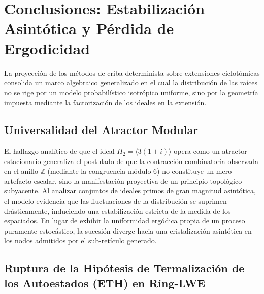 \documentclass{article}
\numberwithin{equation}{section}
\theoremstyle{plain}
\theoremstyle{definition}
\begin{document}
\section{Conclusiones: Estabilización Asintótica y Pérdida de Ergodicidad}
\label{sec:discusion_conclusiones}

La proyección de los métodos de criba determinista sobre extensiones ciclotómicas consolida un marco algebraico generalizado en el cual la distribución de las raíces no se rige por un modelo probabilístico isotrópico uniforme, sino por la geometría impuesta mediante la factorización de los ideales en la extensión.

\subsection{Universalidad del Atractor Modular}

El hallazgo analítico de que el ideal $\Pi_2 = \langle 3(1+i) \rangle$ opera como un atractor estacionario generaliza el postulado de que la contracción combinatoria observada en el anillo $\mathbb{Z}$ (mediante la congruencia módulo $6$) no constituye un mero artefacto escalar, sino la manifestación proyectiva de un principio topológico subyacente. Al analizar conjuntos de ideales primos de gran magnitud asintótica, el modelo evidencia que las fluctuaciones de la distribución se suprimen drásticamente, induciendo una estabilización estricta de la medida de los espaciados. En lugar de exhibir la uniformidad ergódica propia de un proceso puramente estocástico, la sucesión diverge hacia una cristalización asintótica en los nodos admitidos por el sub-retículo generado.

\subsection{Ruptura de la Hipótesis de Termalización de los Autoestados (ETH) en Ring-LWE}
\end{document}
